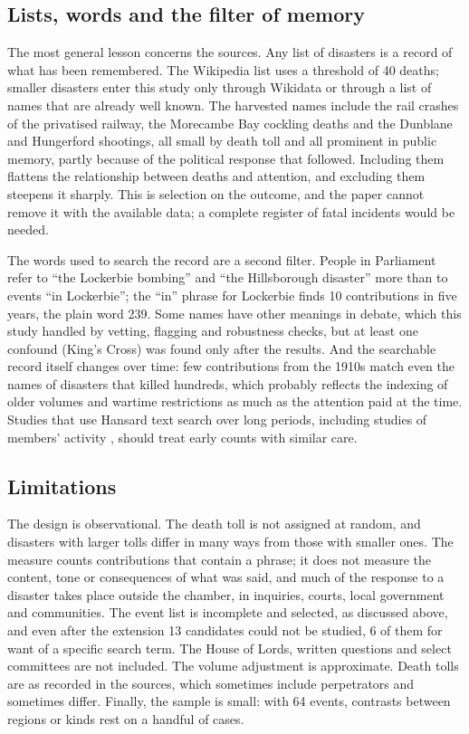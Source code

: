 \documentclass[11pt,a4paper]{article}
\begin{document}
\subsection{Lists, words and the filter of memory}
The most general lesson concerns the sources. Any list of disasters is a record of what has been remembered. The Wikipedia list uses a threshold of 40 deaths; smaller disasters enter this study only through Wikidata or through a list of names that are already well known. The harvested names include the rail crashes of the privatised railway, the Morecambe Bay cockling deaths and the Dunblane and Hungerford shootings, all small by death toll and all prominent in public memory, partly because of the political response that followed. Including them flattens the relationship between deaths and attention, and excluding them steepens it sharply. This is selection on the outcome, and the paper cannot remove it with the available data; a complete register of fatal incidents would be needed.

The words used to search the record are a second filter. People in Parliament refer to ``the Lockerbie bombing'' and ``the Hillsborough disaster'' more than to events ``in Lockerbie''; the ``in'' phrase for Lockerbie finds 10 contributions in five years, the plain word 239. Some names have other meanings in debate, which this study handled by vetting, flagging and robustness checks, but at least one confound (King's Cross) was found only after the results. And the searchable record itself changes over time: few contributions from the 1910s match even the names of disasters that killed hundreds, which probably reflects the indexing of older volumes and wartime restrictions as much as the attention paid at the time. Studies that use Hansard text search over long periods, including studies of members' activity \citep{EggersSpirling2014}, should treat early counts with similar care.

\subsection{Limitations}
The design is observational. The death toll is not assigned at random, and disasters with larger tolls differ in many ways from those with smaller ones. The measure counts contributions that contain a phrase; it does not measure the content, tone or consequences of what was said, and much of the response to a disaster takes place outside the chamber, in inquiries, courts, local government and communities. The event list is incomplete and selected, as discussed above, and even after the extension 13 candidates could not be studied, 6 of them for want of a specific search term. The House of Lords, written questions and select committees are not included. The volume adjustment is approximate. Death tolls are as recorded in the sources, which sometimes include perpetrators and sometimes differ. Finally, the sample is small: with 64 events, contrasts between regions or kinds rest on a handful of cases.
\end{document}
